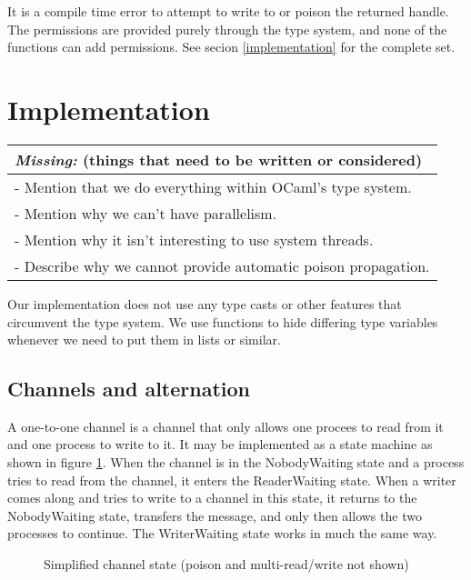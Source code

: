 \documentclass[a4paper,12pt]{article}
\newcommand{\missing}[1]{
  \begin{tabular}{|p{11cm}|}
    \hline
    \emph{Missing:} {\scriptsize (things that need to be written or considered)} \\
    \hline
    #1
    \hline
  \end{tabular}
}
\begin{document}
It is a compile time error to attempt to write to or poison the returned handle.
The permissions are provided purely through the type system, and none of the
functions can add permissions. See secion \ref{implementation} for the complete
set.

\section{Implementation}
\missing{
- Mention that we do everything within OCaml's type system.\\
- Mention why we can't have parallelism.\\
- Mention why it isn't interesting to use system threads.\\
- Describe why we cannot provide automatic poison propagation.\\
}
\label{implementation}

Our implementation does not use any type casts or other features that
circumvent the type system. We use functions to hide differing type variables
whenever we need to put them in lists or similar.

\subsection{Channels and alternation}
A one-to-one channel is a channel that only allows one procees to read from it
and one process 
to write to it. It may be implemented as a state machine as shown in figure \ref{channel-state}.
When the channel is in the NobodyWaiting state and a process tries to read from the channel,
it enters the ReaderWaiting state. When a writer comes along and tries to write to a channel
in this state, it returns to the NobodyWaiting state, transfers the message, and only then
allows the two processes to continue. The WriterWaiting state works in much the same way.

\begin{figure}[h]
\centering
\caption{Simplified channel state (poison and multi-read/write not shown)}
\label{channel-state}
\end{figure}
\end{document}
